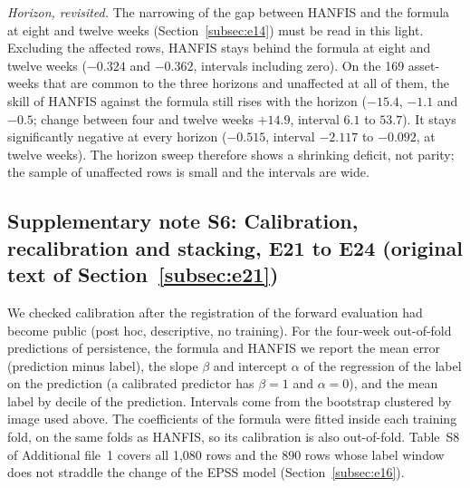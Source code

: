 \documentclass[pdflatex,sn-basic]{sn-jnl}
\theoremstyle{thmstyleone}%
\theoremstyle{thmstyletwo}%
\theoremstyle{thmstylethree}%
\begin{document}
\emph{Horizon, revisited.} The narrowing of the gap between HANFIS and the formula at eight and twelve weeks (Section~\ref{subsec:e14}) must be read in this light. Excluding the affected rows, HANFIS stays behind the formula at eight and twelve weeks ($-0.324$ and $-0.362$, intervals including zero). On the 169 asset-weeks that are common to the three horizons and unaffected at all of them, the skill of HANFIS against the formula still rises with the horizon ($-15.4$, $-1.1$ and $-0.5$; change between four and twelve weeks $+14.9$, interval $6.1$ to $53.7$). It stays significantly negative at every horizon ($-0.515$, interval $-2.117$ to $-0.092$, at twelve weeks). The horizon sweep therefore shows a shrinking deficit, not parity; the sample of unaffected rows is small and the intervals are wide.

\subsection*{Supplementary note S6: Calibration, recalibration and stacking, E21 to E24 (original text of Section~\ref{subsec:e21})}
We checked calibration after the registration of the forward evaluation had become public (post hoc, descriptive, no training). For the four-week out-of-fold predictions of persistence, the formula and HANFIS we report the mean error (prediction minus label), the slope $\beta$ and intercept $\alpha$ of the regression of the label on the prediction (a calibrated predictor has $\beta=1$ and $\alpha=0$), and the mean label by decile of the prediction. Intervals come from the bootstrap clustered by image used above. The coefficients of the formula were fitted inside each training fold, on the same folds as HANFIS, so its calibration is also out-of-fold. Table~S8 of Additional file~1 covers all 1{,}080 rows and the 890 rows whose label window does not straddle the change of the EPSS model (Section~\ref{subsec:e16}).
\end{document}

